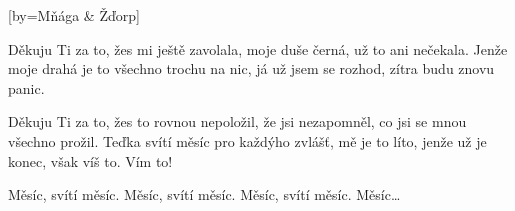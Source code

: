 [by={Mňága \& Žďorp}]

\beginverse*{}
\lrep{}       \rrep{}
\endverse{}

\beginverse{}
Děkuju Ti za to, žes mi ještě zavolala,  
moje duše černá, už to ani nečekala.  
Jenže moje drahá je to všechno trochu na nic,  
já už jsem se rozhod, zítra budu znovu panic.  
\endverse{}

\beginverse*{}
\lrep{}       \rrep{}
\endverse{}

\beginverse{}
Děkuju Ti za to, žes to rovnou nepoložil,  
že jsi nezapomněl, co jsi se mnou všechno prožil.  
Teďka svítí měsíc pro každýho zvlášť, mě je to líto,  
jenže už je konec, 
však víš to. Vím to!
\endverse{}

\beginchorus{}
Měsíc,  svítí měsíc.  
Měsíc,  svítí měsíc.  
Měsíc,  svítí měsíc.  
Měsíc\ldots{}
\endchorus{}

\endsong{}
